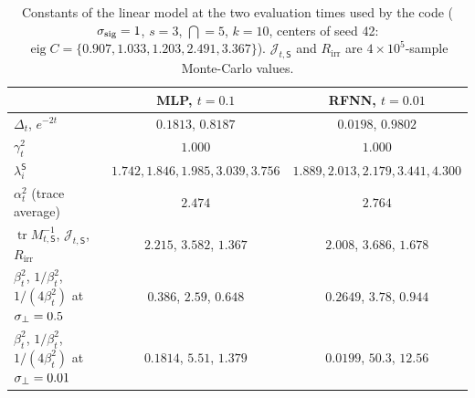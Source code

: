 \begin{table}[h]
\centering\small
\caption{Constants of the linear model at the two evaluation times used by the code ($\sigma_{\mathrm{sig}}=1$, $s=3$, $\dint=5$, $k=10$, centers of seed 42: $\operatorname{eig}C=\{0.907,1.033,1.203,2.491,3.367\}$). $\mathcal J_{t,\mathsf S}$ and $R_{\mathrm{irr}}$ are $4\times10^5$-sample Monte-Carlo values.}\label{tab:lin-constants}
\setlength{\tabcolsep}{4pt}\begin{tabular}{lcc}
\toprule
 & MLP, $t=0.1$ & RFNN, $t=0.01$\\
\midrule
$\Delta_t$, $e^{-2t}$ & $0.1813$, $0.8187$ & $0.0198$, $0.9802$\\
$\gamma_t^2$ & $1.000$ & $1.000$\\
$\lambda^{\mathsf S}_i$ & $1.742,1.846,1.985,3.039,3.756$ & $1.889,2.013,2.179,3.441,4.300$\\
$\alpha_t^2$ (trace average) & $2.474$ & $2.764$\\
$\operatorname{tr}M_{t,\mathsf S}^{-1}$, $\mathcal J_{t,\mathsf S}$, $R_{\mathrm{irr}}$ & $2.215$, $3.582$, $1.367$ & $2.008$, $3.686$, $1.678$\\
$\beta_t^2$, $1/\beta_t^2$, $1/(4\beta_t^2)$ at $\sigma_{\perp}=0.5$ & $0.386$, $2.59$, $0.648$ & $0.2649$, $3.78$, $0.944$\\
$\beta_t^2$, $1/\beta_t^2$, $1/(4\beta_t^2)$ at $\sigma_{\perp}=0.01$ & $0.1814$, $5.51$, $1.379$ & $0.0199$, $50.3$, $12.56$\\
\bottomrule
\end{tabular}
\end{table}

